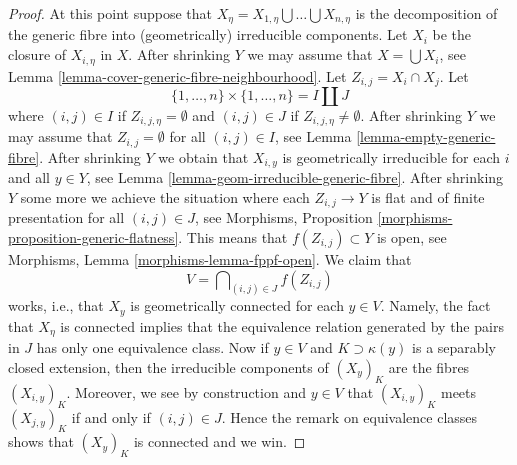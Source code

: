 \begin{proof}
\medskip\noindent
At this point suppose that
$X_\eta = X_{1, \eta} \bigcup \ldots \bigcup X_{n, \eta}$
is the decomposition of the generic fibre into
(geometrically) irreducible components.
Let $X_i$ be the closure of $X_{i, \eta}$ in $X$.
After shrinking $Y$ we may assume that
$X = \bigcup X_i$, see
Lemma \ref{lemma-cover-generic-fibre-neighbourhood}.
Let $Z_{i, j} = X_i \cap X_j$.
Let
$$
\{1, \ldots, n\} \times \{1, \ldots, n\} = I \amalg J
$$
where $(i, j) \in I$ if $Z_{i, j, \eta} = \emptyset$ and
$(i, j) \in J$ if $Z_{i, j, \eta} \not = \emptyset$.
After shrinking $Y$ we may assume that $Z_{i, j} = \emptyset$
for all $(i, j) \in I$, see
Lemma \ref{lemma-empty-generic-fibre}.
After shrinking $Y$ we obtain that $X_{i, y}$
is geometrically irreducible for each $i$ and all $y \in Y$, see
Lemma \ref{lemma-geom-irreducible-generic-fibre}.
After shrinking $Y$ some more we achieve the situation where
each $Z_{i, j} \to Y$ is flat and of finite presentation for
all $(i, j) \in J$, see
Morphisms, Proposition \ref{morphisms-proposition-generic-flatness}.
This means that $f(Z_{i, j}) \subset Y$ is open, see
Morphisms, Lemma \ref{morphisms-lemma-fppf-open}.
We claim that
$$
V  = \bigcap\nolimits_{(i, j) \in J} f(Z_{i, j})
$$
works, i.e., that $X_y$ is geometrically connected for each
$y \in V$. Namely, the fact that $X_\eta$ is connected implies that
the equivalence relation generated by the pairs in $J$ has only
one equivalence class. Now if $y \in V$ and $K \supset \kappa(y)$
is a separably closed extension, then the irreducible components
of $(X_y)_K$ are the fibres $(X_{i, y})_K$. Moreover, we see by
construction and $y \in V$ that $(X_{i, y})_K$ meets $(X_{j, y})_K$
if and only if $(i, j) \in J$. Hence the remark on equivalence classes
shows that $(X_y)_K$ is connected and we win.
\end{proof}